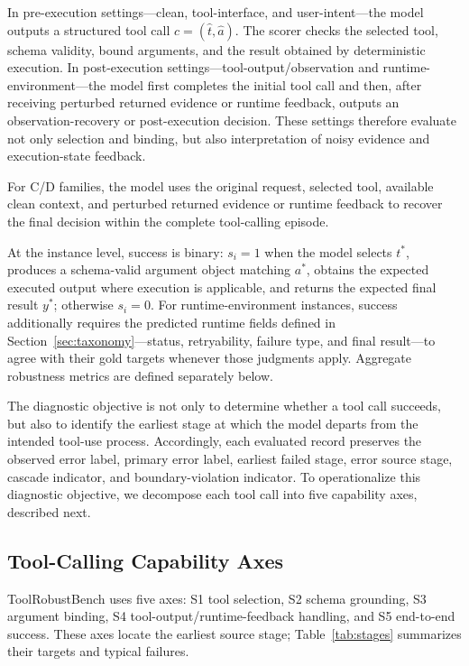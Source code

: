 \documentclass[11pt]{article}
\newcommand{\ToolRobustBench}{ToolRobustBench\xspace}
\begin{document}
In pre-execution settings---clean, tool-interface, and user-intent---the model outputs a structured tool call $\hat{c}=(\hat{t},\hat{a})$. The scorer checks the selected tool, schema validity, bound arguments, and the result obtained by deterministic execution. In post-execution settings---tool-output/observation and runtime-environment---the model first completes the initial tool call and then, after receiving perturbed returned evidence or runtime feedback, outputs an observation-recovery or post-execution decision. These settings therefore evaluate not only selection and binding, but also interpretation of noisy evidence and execution-state feedback.

For C/D families, the model uses the original request, selected tool, available clean context, and perturbed returned evidence or runtime feedback to recover the final decision within the complete tool-calling episode.

At the instance level, success is binary: $s_i=1$ when the model selects $t^*$, produces a schema-valid argument object matching $a^*$, obtains the expected executed output where execution is applicable, and returns the expected final result $y^*$; otherwise $s_i=0$. For runtime-environment instances, success additionally requires the predicted runtime fields defined in Section~\ref{sec:taxonomy}---status, retryability, failure type, and final result---to agree with their gold targets whenever those judgments apply. Aggregate robustness metrics are defined separately below.

The diagnostic objective is not only to determine whether a tool call succeeds, but also to identify the earliest stage at which the model departs from the intended tool-use process. Accordingly, each evaluated record preserves the observed error label, primary error label, earliest failed stage, error source stage, cascade indicator, and boundary-violation indicator. To operationalize this diagnostic objective, we decompose each tool call into five capability axes, described next.

\subsection{Tool-Calling Capability Axes}

\ToolRobustBench{} uses five axes: S1 tool selection, S2 schema grounding, S3 argument binding, S4 tool-output/runtime-feedback handling, and S5 end-to-end success. These axes locate the earliest source stage; Table~\ref{tab:stages} summarizes their targets and typical failures.
\end{document}

